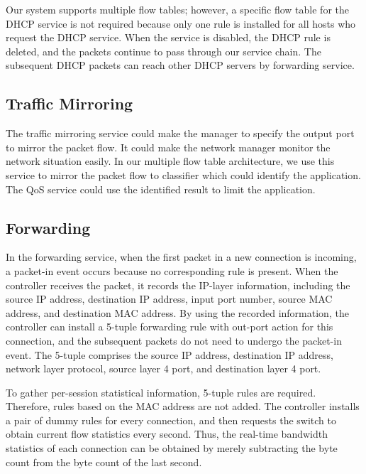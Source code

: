 \documentclass[conference]{IEEEtran}
\begin{document}
Our system supports multiple flow tables; however, a specific flow table for the DHCP service is not required because only one rule is installed for all hosts who request the DHCP service.
When the service is disabled, the DHCP rule is deleted, and the packets continue to pass through our service chain.
The subsequent DHCP packets can reach other DHCP servers by forwarding service.



\subsection{Traffic Mirroring} \label{ssec:mirror}
The traffic mirroring service could make the manager to specify the output port to mirror the packet flow.
It could make the network manager monitor the network situation easily.
In our multiple flow table architecture, we use this service to mirror the packet flow to classifier which could identify the application.
The QoS service could use the identified result to limit the application.



\subsection{Forwarding} \label{ssec:forwarding}
In the forwarding service, when the first packet in a new connection is incoming, a packet-in event occurs because no corresponding rule is present.
When the controller receives the packet, it records the IP-layer information, including the source IP address, destination IP address, input port number, source MAC address, and destination MAC address.
By using the recorded information, the controller can install a 5-tuple forwarding rule with out-port action for this connection, and the subsequent packets do not need to undergo the packet-in event.
The 5-tuple comprises the source IP address, destination IP address, network layer protocol, source layer 4 port, and destination layer 4 port.

To gather per-session statistical information, 5-tuple rules are required. Therefore, rules based on the MAC address are not added.
The controller installs a pair of dummy rules for every connection, and then requests the switch to obtain current flow statistics every second.
Thus, the real-time bandwidth statistics of each connection can be obtained by merely subtracting the byte count from the byte count of the last second.
\end{document}
